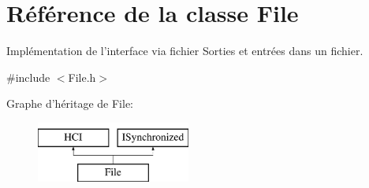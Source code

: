 \hypertarget{classFile}{\section{Référence de la classe File}
\label{classFile}
}


Implémentation de l'interface via fichier Sorties et entrées dans un fichier.  




{\ttfamily \#include $<$File.\-h$>$}

Graphe d'héritage de File\-:\begin{figure}[H]
\begin{center}
\leavevmode
\includegraphics[height=2.000000cm]{classFile}
\end{center}
\end{figure}
